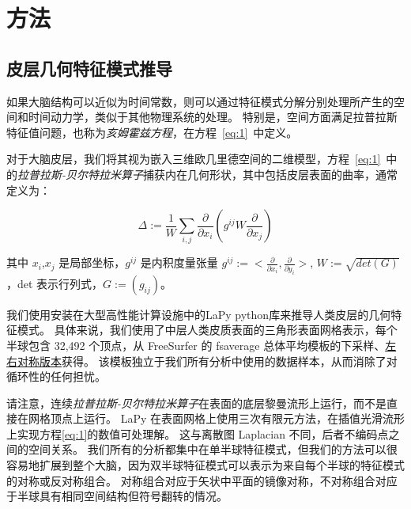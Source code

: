\documentclass[lang=cn,a4paper,newtx,citestyle=gb7714-2015, bibstyle=gb7714-2015]{elegantpaper}
\begin{document}
\section{方法} \label{sec:method}

\subsection{皮层几何特征模式推导} \label{sec:derivation}

如果大脑结构可以近似为时间常数，则可以通过特征模式分解\cite{nowack1995neocortical,robinson2016eigenmodes}分别处理所产生的空间和时间动力学，类似于其他物理系统的处理\cite{melrose1991electromagnetic}。
特别是，空间方面满足拉普拉斯特征值问题，也称为\textit{亥姆霍兹方程}，在方程~\ref{eq:1}~中定义。


对于大脑皮层，我们将其视为嵌入三维欧几里德空间的二维模型，方程~\ref{eq:1}~中的\textit{拉普拉斯-贝尔特拉米算子}捕获内在几何形状，其中包括皮层表面的曲率\cite{wachinger2015brainprint}，通常定义为\cite{chavel1984eigenvalues,seo2011laplace}：


\begin{equation}\label{eq:surface_curvature}
	\Delta:=\frac{1}{W} \sum_{i,j} \frac{\partial}{\partial x_i} (g^{ij} W \frac{\partial}{\partial x_j})
\end{equation}

其中 $ x_i $,$ x_j $ 是局部坐标，$ g^{ij} $ 是内积度量张量 $ g^{ij}:=<\frac{\partial}{\partial x_i}, \frac{\partial}{\partial y_i}> $, $ W:=\sqrt{det(G)} $，det 表示行列式，$ G:=(g_{ij}) $。


我们使用安装在大型高性能计算设施\cite{goscinski2014multi}中的LaPy python库\cite{wachinger2015brainprint,reuter2006laplace}来推导人类皮层的几何特征模式。 
具体来说，我们使用了中层人类皮质表面的三角形表面网格表示，每个半球包含 32,492 个顶点，从 FreeSurfer 的 fsaverage 总体平均模板的下采样、\href{https://github.com/ ThomasYeoLab/CBIG/tree/master/data/templates/surface/fs_LR_32k}{左右对称版本}获得\cite{fischl1999high}。
该模板独立于我们所有分析中使用的数据样本，从而消除了对循环性的任何担忧。


请注意，连续\textit{拉普拉斯-贝尔特拉米算子}在表面的底层黎曼流形上运行，而不是直接在网格顶点上运行。
LaPy 在表面网格上使用三次有限元方法，在插值光滑流形上实现方程\ref{eq:1}的数值可处理解。
这与离散图 Laplacian \cite{shuman2013emerging} 不同，后者不编码点之间的空间关系。
我们所有的分析都集中在单半球特征模式，但我们的方法可以很容易地扩展到整个大脑，因为双半球特征模式可以表示为来自每个半球的特征模式的对称或反对称组合。
对称组合对应于矢状中平面的镜像对称，不对称组合对应于半球具有相同空间结构但符号翻转的情况。
\end{document}
